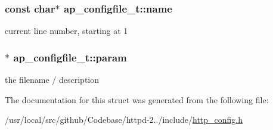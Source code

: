 \subsubsection[{\texorpdfstring{name}{name}}]{\setlength{\rightskip}{0pt plus 5cm}const char$\ast$ ap\+\_\+configfile\+\_\+t\+::name}\hypertarget{structap__configfile__t_aaac6a6cdb23bd7e2f24de828d06e6c2e}{}\label{structap__configfile__t_aaac6a6cdb23bd7e2f24de828d06e6c2e}
current line number, starting at 1 
\subsubsection[{\texorpdfstring{param}{param}}]{$\ast$ ap\+\_\+configfile\+\_\+t\+::param}\hypertarget{structap__configfile__t_ac539aebe520d927e696014cf4a515f5b}{}\label{structap__configfile__t_ac539aebe520d927e696014cf4a515f5b}
the filename / description 

The documentation for this struct was generated from the following file\+:\begin{DoxyCompactItemize}
\item 
/usr/local/src/github/\+Codebase/httpd-\/2../include/\hyperlink{http__config_8h}{http\+\_\+config.\+h}\end{DoxyCompactItemize}
